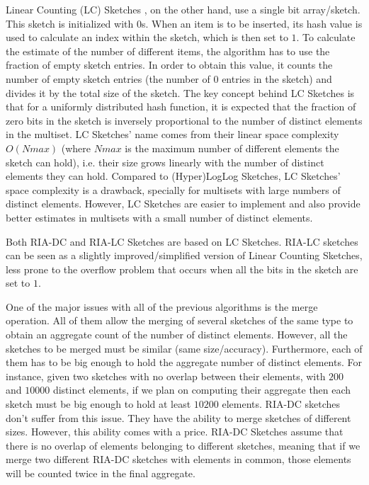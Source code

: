 Linear Counting (LC) Sketches \cite{Whang:1990uh}, on the other hand,
use a single bit array/sketch. This sketch is initialized with $0$s.
When an item is to be inserted, its hash value is used to calculate an
index within the sketch, which is then set to $1$. To calculate the
estimate of the number of different items, the algorithm has to use
the fraction of empty sketch entries. In order to obtain this value,
it counts the number of empty sketch entries (the number of $0$
entries in the sketch) and divides it by the total size of the sketch.
The key concept behind LC Sketches is that for a uniformly distributed
hash function, it is expected that the fraction of zero bits in the
sketch is inversely proportional to the number of distinct elements in
the multiset. LC Sketches' name comes from their linear space
complexity $O(Nmax)$ (where $Nmax$ is the maximum number of different
elements the sketch can hold), i.e. their size grows linearly with the
number of distinct elements they can hold. Compared to (Hyper)LogLog
Sketches, LC Sketches' space complexity is a drawback, specially for
multisets with large numbers of distinct elements. However, LC
Sketches are easier to implement and also provide better estimates in
multisets with a small number of distinct elements. 

Both RIA-DC \cite{Fan:2008wl,YaoChungFanArbeeLPChen:2010to} and RIA-LC
Sketches \cite{YaoChungFanArbeeLPChen:2010to} are based on LC
Sketches. RIA-LC sketches can be seen as a slightly
improved/simplified version of Linear Counting Sketches, less prone to
the overflow problem that occurs when all the bits in the sketch are
set to $1$. 

One of the major issues with all of the previous algorithms is the
merge operation. All of them allow the merging of several sketches of
the same type to obtain an aggregate count of the number of distinct
elements. However, all the sketches to be merged must be similar (same
size/accuracy). Furthermore, each of them has to be big enough to hold
the aggregate number of distinct elements. For instance, given two
sketches with no overlap between their elements, with $200$ and
$10000$ distinct elements, if we plan on computing their aggregate 
then each sketch must be big enough to hold at least $10200$ elements.
RIA-DC sketches don't suffer from this issue. They have the ability to
merge sketches of different sizes. However, this ability comes with a
price. RIA-DC Sketches assume that there is no overlap of elements
belonging to different sketches, meaning that if we merge two
different RIA-DC sketches with elements in common, those elements will
be counted twice in the final aggregate.

